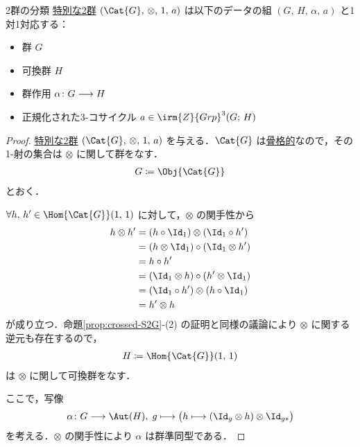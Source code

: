 \documentclass[TQFT_main]{subfiles}
\begin{document}
\begin{myprop}[label=prop:classification2G]{2群の分類}
    \hyperref[def:special2G]{特別な2群} $(\Cat{G},\, \otimes,\, 1,\, a)$ は以下のデータの組 $(G,\, H,\, \alpha,\, a)$ と1対1対応する：
    \begin{itemize}
        \item 群 $G$
        \item 可換群 $H$
        \item 群作用 $\alpha \colon G \longrightarrow H$
        \item 正規化された3-コサイクル $a \in \irm{Z}{Grp}^3(G;\, H)$
    \end{itemize}
    
\end{myprop}

\begin{proof}
    \hyperref[def:special2G]{特別な2群} $(\Cat{G},\, \otimes,\, 1,\, a)$ を与える．$\Cat{G}$ は\hyperref[def:skeltal2G]{骨格的}なので，その1-射の集合は $\otimes$ に関して群をなす．
    \begin{align}
        G \coloneqq \Obj{\Cat{G}}
    \end{align}
    とおく．

    $\forall h,\, h' \in \Hom{\Cat{G}}(1,\, 1)$ に対して，$\otimes$ の関手性から
    \begin{align}
        h \otimes h' 
        &= (h \circ \Id_1) \otimes (\Id_1 \circ h') \\
        &= (h \otimes \Id_1) \circ (\Id_1 \otimes h') \\
        &= h \circ h' \\
        &= (\Id_1 \otimes h) \circ (h' \otimes \Id_1) \\
        &= (\Id_1 \circ h') \otimes (h \circ \Id_1) \\
        &= h' \otimes h
    \end{align}
    が成り立つ．命題\ref{prop:crossed-S2G}-(2) の証明と同様の議論により $\otimes$ に関する逆元も存在するので，
    \begin{align}
        H \coloneqq \Hom{\Cat{G}}(1,\, 1)
    \end{align}
    は $\otimes$ に関して可換群をなす．

    ここで，写像
    \begin{align}
        \alpha \colon G \lto \Aut(H),\; g \lmto \bigl(h \lmto (\Id_g \otimes h) \otimes \Id_{g*}\bigr)
    \end{align}
    を考える．$\otimes$ の関手性により $\alpha$ は群準同型である．
    

\end{proof}
\end{document}
